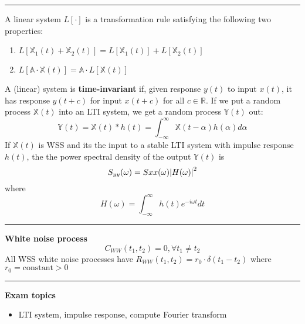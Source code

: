 \documentclass{article}
\DeclarePairedDelimiter\abs{\lvert}{\rvert}
\providecommand{\A}{\mathbb{A}}
\providecommand{\X}{\mathbb{X}}
\providecommand{\Y}{\mathbb{Y}}
\providecommand{\R}{\mathbb{R}}
\begin{document}
\begin{multicols*}{3}
        \noindent\rule{\columnwidth}{0.4pt}

        A linear system $L[\cdot]$ is a transformation rule satisfying the following two properties:
        \begin{enumerate}
            \item $L[\X_1(t)+\X_2(t)] = L[\X_1(t)] + L[\X_2(t)]$
            \item $L[\A\cdot\X(t)] = \A\cdot L[\X(t)]$
        \end{enumerate}
        A (linear) system is \textbf{time-invariant} if, given response $y(t)$ to input $x(t)$, it has response $y(t+c)$ for input $x(t+c)$ for all $c\in\R$.
        If we put a random process $\X(t)$ into an LTI system, we get a random process $\Y(t)$ out:
        \begin{equation*}
            \Y(t) = \X(t) * h(t) = \int_{-\infty}^{\infty} \X(t-\alpha)h(\alpha)d\alpha
        \end{equation*}
        If $\X(t)$ is WSS and its the input to a stable LTI system with impulse response $h(t)$, the the power spectral density of the output $\Y(t)$ is
        \begin{equation*}
            S_{yy}(\omega) = S{xx}(\omega)\abs*{H(\omega)}^2
        \end{equation*}
        where
        \begin{equation*}
            H(\omega) = \int_{-\infty}^{\infty} h(t)e^{-i\omega t}dt
        \end{equation*}

        \noindent\rule{\columnwidth}{0.4pt}

        \textbf{White noise process}
        \begin{equation*}
            C_{WW}(t_1,t_2) = 0,\forall t_1 \neq t_2
        \end{equation*}
        All WSS white noise processes have $R_{WW}(t_1,t_2) = r_0\cdot \delta(t_1-t_2)$ where $r_0 = \text{constant}>0$

        \noindent\rule{\columnwidth}{0.4pt}

        \textbf{Exam topics}
        \begin{itemize}
            \item LTI system, impulse response, compute Fourier transform
        \end{itemize}

    \end{multicols*}
\end{document}
